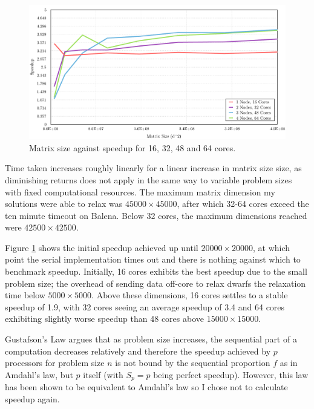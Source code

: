 \documentclass[12pt]{article}
\begin{document}
\begin{figure}[htbp!]
	\centering\includegraphics[width=\textwidth]{img/dimension-speedup}
	\caption{Matrix size against speedup for 16, 32, 48 and 64 cores.}
	\label{fig:dimension-sp}
\end{figure}

Time taken increases roughly linearly for a linear increase in matrix size size, as diminishing returns does not apply in the same way to variable problem sizes with fixed computational resources. The maximum matrix dimension my solutions were able to relax was $45000\times{}45000$, after which 32-64 cores exceed the ten minute timeout on Balena. Below 32 cores, the maximum dimensions reached were $42500\times{}42500$.

Figure \ref{fig:dimension-sp} shows the initial speedup achieved up until $20000\times{}20000$, at which point the serial implementation times out and there is nothing against which to benchmark speedup. Initially, 16 cores exhibits the best speedup due to the small problem size; the overhead of sending data off-core to relax dwarfs the relaxation time below $5000\times{}5000$. Above these dimensions, 16 cores settles to a stable speedup of 1.9, with 32 cores seeing an average speedup of 3.4 and 64 cores exhibiting slightly worse speedup than 48 cores above $15000\times{}15000$.

Gustafson's Law argues that as problem size increases, the sequential part of a computation decreases relatively and therefore the speedup achieved by $p$ processors for problem size $n$ is not bound by the sequential proportion $f$ as in Amdahl's law, but $p$ itself (with $S_p = p$ being perfect speedup). However, this law has been shown to be equivalent to Amdahl's law \citep{reevaluating} so I chose not to calculate speedup again.

\clearpage
\end{document}
